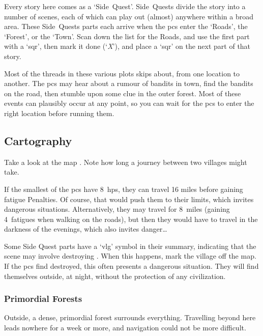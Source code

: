 \begin{multicols}{2}

\noindent
Every story here comes as a  `Side~Quest'.%
Side~Quests divide the story into a number of scenes, each of which can play out (almost) anywhere within a broad area.
These Side~Quests parts each arrive when the \glspl{pc} enter the `Roads', the `Forest', or the `Town'.
Scan down the list  for the Roads, and use the first part with a `\gls{sqr}', then mark it done (`\textit{X}'), and place a `\gls{sqr}' on the next part of that story.

Most of the threads in these various plots skips about, from one location to another.
The \glspl{pc} may hear about a rumour of bandits in town, find the bandits on the road, then stumble upon some clue in the outer forest.
Most of these events can plausibly occur at any point, so you can wait for the \glspl{pc} to enter the right location before running them.

\subsection{Cartography}

Take a look at the map .
Note how long a journey between two \glspl{village} might take.

If the smallest of the \glspl{pc} have 8~\glspl{hp}, they can travel 16 miles before gaining \gls{fatigue} Penalties.
Of course, that would push them to their limits, which invites dangerous situations.
Alternatively, they may travel for 8~miles (gaining 4~\glspl{fatigue} when walking on the roads), but then they would have to travel in the darkness of the evenings, which also invites danger\ldots

Some Side Quest parts have a `\gls{vlg}' symbol in their summary, indicating that the scene may involve destroying .
When this happens, mark the \gls{village} off the map.
If the \glspl{pc} find  destroyed, this often presents a dangerous situation.
They will find themselves outside, at night, without the protection of any civilization.

\subsubsection{Primordial Forests}
Outside, a dense, primordial forest surrounds everything.
Travelling beyond here leads nowhere for a week or more, and navigation could not be more difficult.


\end{multicols}
